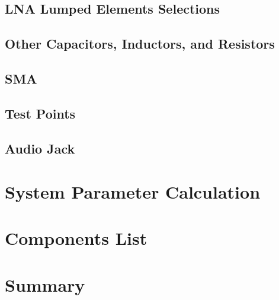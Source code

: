 \documentclass[]{article}
\begin{document}
\subsection{LNA Lumped Elements Selections}
\subsection{Other Capacitors, Inductors, and Resistors}
\subsection{SMA}
\subsection{Test Points}
\subsection{Audio Jack}
\section{System Parameter Calculation}
\section{Components List}
\section{Summary}
\end{document}

